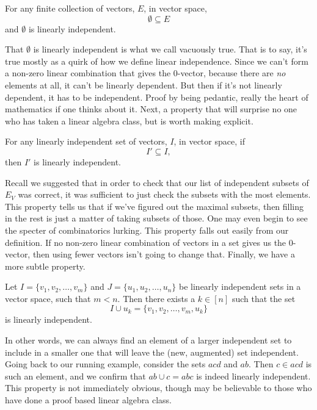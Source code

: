 \documentclass[12pt,oneside]{../../sfsuthesis}
\begin{document}
\begin{property}
    For any finite collection of vectors, \( E \), in vector space,
    \[
        \emptyset \subseteq E
    \]
    and \( \emptyset \) is linearly independent.
\end{property}
That \( \emptyset \) is linearly independent is what we call vacuously true.
That is to say, it's true mostly as a quirk of how we define linear independence.
Since we can't form a non-zero linear combination that gives the 0-vector, because there are \emph{no} elements at all, it can't be linearly dependent.
But then if it's not linearly dependent, it has to be independent.
Proof by being pedantic, really the heart of mathematics if one thinks about it.
Next, a property that will surprise no one who has taken a linear algebra class, but is worth making explicit.

\begin{property}
    For any linearly independent set of vectors, \( I \), in vector space, if
    \[
        I' \subseteq I,
    \]
    then \( I' \) is linearly independent.
\end{property}
Recall we suggested that in order to check that our list of independent subsets of \( E_V \) was correct, it was sufficient to just check the subsets with the most elements.
This property tells us that if we've figured out the maximal subsets, then filling in the rest is just a matter of taking subsets of those.
One may even begin to see the specter of combinatorics lurking.
This property falls out easily from our definition.
If no non-zero linear combination of vectors in a set gives us the 0-vector, then using fewer vectors isn't going to change that.
Finally, we have a more subtle property.

\begin{property}
    Let \( I = \{v_1, v_2, \ldots, v_m\} \) and \( J = \{ u_1, u_2, \ldots, u_n \} \) be linearly independent sets in a vector space, such that \( m < n \).
    Then there exists a \( k \in [n] \) such that the set
    \[
        I \cup u_k = \{v_1, v_2, \ldots, v_m, u_k \}
    \]
    is linearly independent.
\end{property}
In other words, we can always find an element of a larger independent set to include in a smaller one that will leave the (new, augmented) set independent.
Going back to our running example, consider the sets \( acd \) and \( ab \).
Then \( c \in acd \) is such an element, and we confirm that \( ab \cup c = abc \) is indeed linearly independent.
This property is not immediately obvious, though may be believable to those who have done a proof based linear algebra class.
\end{document}
